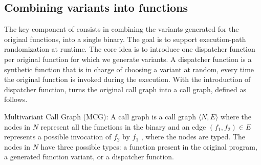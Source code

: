 \subsection*{Combining variants into functions}

The key component of \tool consists in combining the variants generated for the original functions, into a single binary.
The goal is to support execution-path randomization at runtime.
The core idea is to introduce one dispatcher function per original function for which we generate variants.
A dispatcher function is a synthetic function that is in charge of choosing a variant at random, every time the original function is invoked during the execution.
With the introduction of dispatcher function,  \tool turns the original call graph into a call graph, defined as follows. 

\begin{definition}{Multivariant Call Graph (MCG):}\label{def:EP}
    A call graph is a call graph $\langle N,E \rangle$ where the nodes in $N$ represent all the functions in the binary and an edge $(f_1,f_2) \in E$ represents a possible invocation of $f_2$ by $f_1$  \cite{ryder1979}, where the nodes are typed. The nodes in $N$ have three possible types: a function present in the original program,  a generated function variant, or a dispatcher function.
\end{definition}


